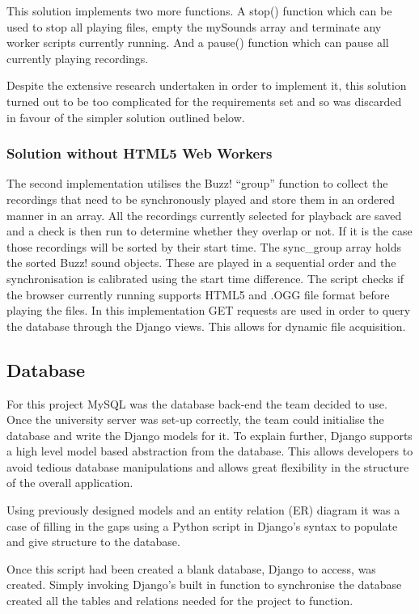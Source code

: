 \documentclass{l3proj}
\begin{document}
This solution implements two more functions. A stop() function which can be used to stop all playing files, empty the mySounds array and terminate any worker scripts currently running. And a pause() function which can pause all currently playing recordings.

Despite the extensive research undertaken in order to implement it, this solution turned out to be too complicated for the requirements set and so was discarded in favour of the simpler solution outlined below.

\subsubsection{Solution without HTML5 Web Workers}
The second implementation utilises the Buzz! “group” function to collect the recordings that need to be synchronously played and store them in an ordered manner in an array. All the recordings currently selected for playback are saved and a check is then run to determine whether they overlap or not. If it is the case those recordings will be sorted by their start time. The sync\_group array holds the sorted Buzz! sound objects. These are played in a sequential order and the synchronisation is calibrated using the start time difference. The script checks if the browser currently running supports HTML5  and .OGG file format before playing the files. In this implementation GET requests are used in order to query the database through the Django views. This allows for dynamic file acquisition.

\subsection{Database}
For this project MySQL was the database back-end the team decided to use. Once the university server was set-up correctly, the team could initialise the database and write the Django models for it. To explain further, Django supports a high level model based abstraction from the database. This allows developers to avoid tedious database manipulations and allows great flexibility in the structure of the overall application.

Using previously designed models and an entity relation (ER) diagram it was a case of filling in the gaps using a Python script in Django's syntax to populate and give structure to the database.

Once this script had been created a blank database, Django to access, was created. Simply invoking Django's built in function to synchronise the database created all the tables and relations needed for the project to function.
\end{document}
